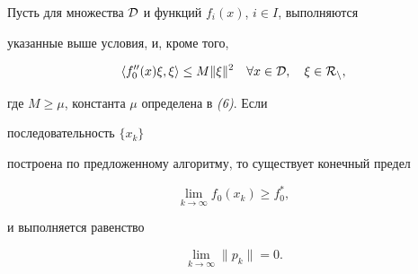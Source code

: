 \begin{lem}


Пусть для множества $\cal D$ и функций $f_i(x)$, $i\in I$, выполняются


указанные выше условия, и, кроме того,


\begin{equation}


\la f''_0(x)\xi,\xi\ra\le M\|\xi\|^2\quad


\forall x\in\cal D,\quad \xi\in R_n,


\end{equation}


где $M\ge \mu$, константа $\mu$ определена в {\em (6)}. Если


последовательность $\{x_k\}$


построена по предложенному алгоритму, то существует конечный предел


\begin{equation}


\lim_{k\to\infty}f_0(x_k)\ge f^*_0,


\end{equation}


и выполняется равенство


\begin{equation}


\lim_{k\to\infty}\|p_k\|=0.


\end{equation}


\end{lem}





